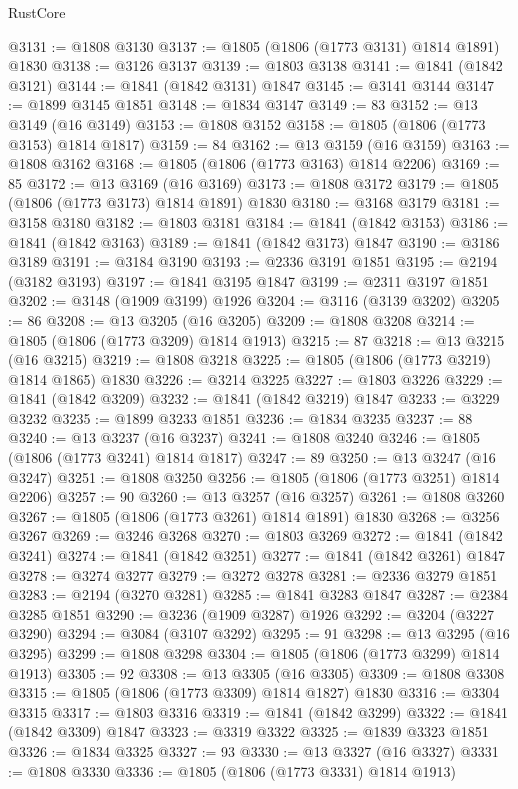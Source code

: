 \begin{lexlean}{RustCore}
\begin{coremodule}
@3131 := @1808 @3130
@3137 := @1805 (@1806 (@1773 @3131) @1814 @1891) @1830
@3138 := @3126 @3137
@3139 := @1803 @3138
@3141 := @1841 (@1842 @3121)
@3144 := @1841 (@1842 @3131) @1847
@3145 := @3141 @3144
@3147 := @1899 @3145 @1851
@3148 := @1834 @3147
@3149 := 83
@3152 := @13 @3149 (@16 @3149)
@3153 := @1808 @3152
@3158 := @1805 (@1806 (@1773 @3153) @1814 @1817)
@3159 := 84
@3162 := @13 @3159 (@16 @3159)
@3163 := @1808 @3162
@3168 := @1805 (@1806 (@1773 @3163) @1814 @2206)
@3169 := 85
@3172 := @13 @3169 (@16 @3169)
@3173 := @1808 @3172
@3179 := @1805 (@1806 (@1773 @3173) @1814 @1891) @1830
@3180 := @3168 @3179
@3181 := @3158 @3180
@3182 := @1803 @3181
@3184 := @1841 (@1842 @3153)
@3186 := @1841 (@1842 @3163)
@3189 := @1841 (@1842 @3173) @1847
@3190 := @3186 @3189
@3191 := @3184 @3190
@3193 := @2336 @3191 @1851
@3195 := @2194 (@3182 @3193)
@3197 := @1841 @3195 @1847
@3199 := @2311 @3197 @1851
@3202 := @3148 (@1909 @3199) @1926
@3204 := @3116 (@3139 @3202)
@3205 := 86
@3208 := @13 @3205 (@16 @3205)
@3209 := @1808 @3208
@3214 := @1805 (@1806 (@1773 @3209) @1814 @1913)
@3215 := 87
@3218 := @13 @3215 (@16 @3215)
@3219 := @1808 @3218
@3225 := @1805 (@1806 (@1773 @3219) @1814 @1865) @1830
@3226 := @3214 @3225
@3227 := @1803 @3226
@3229 := @1841 (@1842 @3209)
@3232 := @1841 (@1842 @3219) @1847
@3233 := @3229 @3232
@3235 := @1899 @3233 @1851
@3236 := @1834 @3235
@3237 := 88
@3240 := @13 @3237 (@16 @3237)
@3241 := @1808 @3240
@3246 := @1805 (@1806 (@1773 @3241) @1814 @1817)
@3247 := 89
@3250 := @13 @3247 (@16 @3247)
@3251 := @1808 @3250
@3256 := @1805 (@1806 (@1773 @3251) @1814 @2206)
@3257 := 90
@3260 := @13 @3257 (@16 @3257)
@3261 := @1808 @3260
@3267 := @1805 (@1806 (@1773 @3261) @1814 @1891) @1830
@3268 := @3256 @3267
@3269 := @3246 @3268
@3270 := @1803 @3269
@3272 := @1841 (@1842 @3241)
@3274 := @1841 (@1842 @3251)
@3277 := @1841 (@1842 @3261) @1847
@3278 := @3274 @3277
@3279 := @3272 @3278
@3281 := @2336 @3279 @1851
@3283 := @2194 (@3270 @3281)
@3285 := @1841 @3283 @1847
@3287 := @2384 @3285 @1851
@3290 := @3236 (@1909 @3287) @1926
@3292 := @3204 (@3227 @3290)
@3294 := @3084 (@3107 @3292)
@3295 := 91
@3298 := @13 @3295 (@16 @3295)
@3299 := @1808 @3298
@3304 := @1805 (@1806 (@1773 @3299) @1814 @1913)
@3305 := 92
@3308 := @13 @3305 (@16 @3305)
@3309 := @1808 @3308
@3315 := @1805 (@1806 (@1773 @3309) @1814 @1827) @1830
@3316 := @3304 @3315
@3317 := @1803 @3316
@3319 := @1841 (@1842 @3299)
@3322 := @1841 (@1842 @3309) @1847
@3323 := @3319 @3322
@3325 := @1839 @3323 @1851
@3326 := @1834 @3325
@3327 := 93
@3330 := @13 @3327 (@16 @3327)
@3331 := @1808 @3330
@3336 := @1805 (@1806 (@1773 @3331) @1814 @1913)

\end{coremodule}
\end{lexlean}
